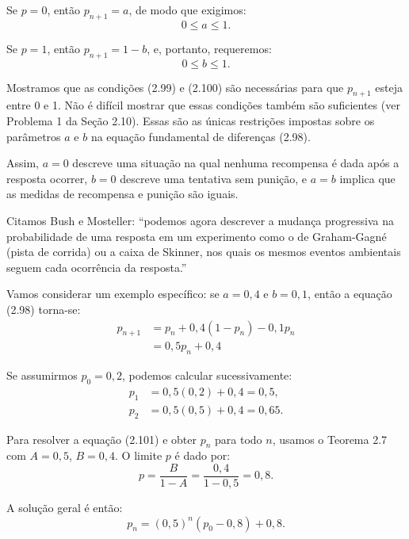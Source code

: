 \documentclass{article}
\begin{document}
Se $p = 0$, então $p_{n+1} = a$, de modo que exigimos:
\begin{equation}
0 \leq a \leq 1.
\tag{2.99}
\end{equation}

Se $p = 1$, então $p_{n+1} = 1 - b$, e, portanto, requeremos:
\begin{equation}
0 \leq b \leq 1.
\tag{2.100}
\end{equation}

Mostramos que as condições (2.99) e (2.100) são necessárias para que $p_{n+1}$ esteja entre 0 e 1. Não é difícil mostrar que essas condições também são suficientes (ver Problema 1 da Seção 2.10). Essas são as únicas restrições impostas sobre os parâmetros $a$ e $b$ na equação fundamental de diferenças (2.98).

Assim, $a = 0$ descreve uma situação na qual nenhuma recompensa é dada após a resposta ocorrer, $b = 0$ descreve uma tentativa sem punição, e $a = b$ implica que as medidas de recompensa e punição são iguais.

Citamos Bush e Mosteller: “podemos agora descrever a mudança progressiva na probabilidade de uma resposta em um experimento como o de Graham-Gagné (pista de corrida) ou a caixa de Skinner, nos quais os mesmos eventos ambientais seguem cada ocorrência da resposta.”

Vamos considerar um exemplo específico: se $a = 0{,}4$ e $b = 0{,}1$, então a equação (2.98) torna-se:
\begin{align*}
p_{n+1} &= p_n + 0{,}4(1 - p_n) - 0{,}1p_n \\
        &= 0{,}5p_n + 0{,}4
\tag{2.101}
\end{align*}

Se assumirmos $p_0 = 0{,}2$, podemos calcular sucessivamente:
\begin{align*}
p_1 &= 0{,}5(0{,}2) + 0{,}4 = 0{,}5, \\
p_2 &= 0{,}5(0{,}5) + 0{,}4 = 0{,}65.
\end{align*}

Para resolver a equação (2.101) e obter $p_n$ para todo $n$, usamos o Teorema 2.7 com $A = 0{,}5$, $B = 0{,}4$. O limite $p$ é dado por:
\begin{equation}
p = \frac{B}{1 - A} = \frac{0{,}4}{1 - 0{,}5} = 0{,}8.
\end{equation}

A solução geral é então:
\begin{equation}
p_n = (0{,}5)^n(p_0 - 0{,}8) + 0{,}8.
\tag{2.102}
\end{equation}
\end{document}

